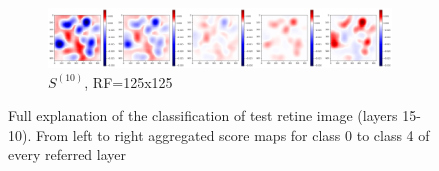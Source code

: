 \documentclass[preprint]{elsarticle}
\theoremstyle{definition} %
\theoremstyle{remark}
\begin{document}
\begin{figure}[h!]
	\begin{subfigure}[b]{\textwidth}
		\includegraphics[width=\textwidth]{figures/score-prop-23713_left/score_rf125.png}
		\caption{$S^{(10)}$, RF=125x125}
		\label{fig:score_rf125}
	\end{subfigure}
	
	\caption{Full explanation of the classification of test retine image (layers 15-10). From left to right aggregated score maps for class 0 to class 4 of every referred layer}
	\label{fig:test1_score_explanation_rf}
\end{figure}
\end{document}
